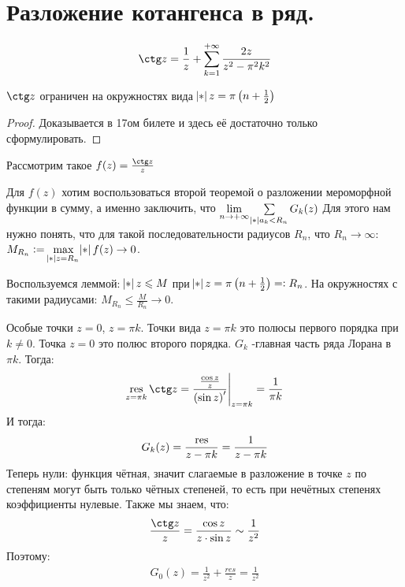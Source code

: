 \section{Разложение котангенса в ряд.}
\begin{example}
    \begin{gather*}
        \ctg z = \frac{1}{z} + \sum_{k=1}^{+\infty} \frac{2z}{z^2-\pi^2k^2}
    \end{gather*}
\end{example}

\begin{lemma}
    $\ctg z$ ограничен на окружностях вида $\abs{z} = \pi\left(n + \frac12\right)$
\end{lemma}

\begin{proof}

    Доказывается в 17ом билете и здесь её достаточно только сформулировать.
    
\end{proof}

Рассмотрим такое $f(z) = \frac{\ctg z}{z}$

Для $f(z)$ хотим воспользоваться второй теоремой о разложении мероморфной функции в сумму, а именно заключить, что $\lim\limits_{n \to +\infty} \sum\limits_{\abs{a_k} < R_n}^{} G_k(z)$
Для этого нам нужно понять, что для такой последовательности радиусов $R_n$, что $R_n \to \infty$: $M_{R_n} := \underset{\abs{z} = R_n}{\max} \abs{f(z)} \to 0$.

Воспользуемся леммой: $\abs{z} \le M$ при $\abs{z} = \pi\left(n + \frac12\right) =: R_n$. На окружностях с такими радиусами: $M_{R_n} \le \frac{M}{R_n} \to 0$.

Особые точки $z = 0$, $z = \pi k$. Точки вида $z = \pi k$ это полюсы первого порядка при $k \neq 0$. Точка $z = 0$ это полюс второго порядка. $G_k$ -главная часть ряда Лорана в $\pi k$. Тогда: 
\begin{gather*}
    \res\limits_{z=\pi k} \ctg z = \eval{\frac{\frac{\cos z}{z}}{\left( \sin z \right)'}}_{z=\pi k} = \frac{1}{\pi k}
\end{gather*}
И тогда:
\begin{gather*}
    G_k(z) = \frac{\operatorname*{res}}{z-\pi k} = \frac{1}{z-\pi k}
\end{gather*}
Теперь нули: функция чётная, значит слагаемые в разложение в точке $z$ по степеням могут быть только чётных степеней, то есть при нечётных степенях коэффициенты нулевые. Также мы знаем, что:
\begin{gather*}
    \frac{\ctg z}{z} = \frac{\cos z}{z \cdot \sin z} \sim \frac{1}{z^2}
\end{gather*} 
Поэтому: 
\begin{gather*}
    G_0(z) = \frac{1}{z^2} + \frac{res}{z}= \frac{1}{z^2}
\end{gather*}

